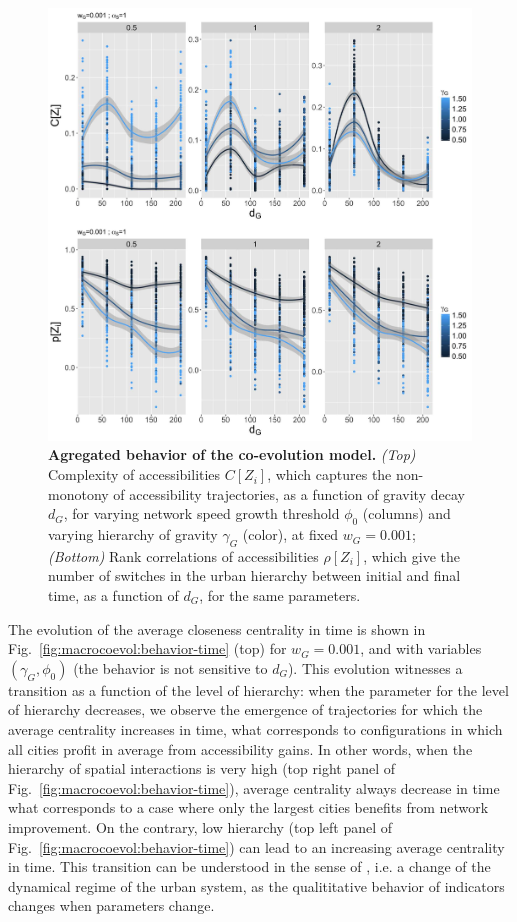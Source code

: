 \documentclass[11pt]{article}
\begin{document}
\begin{figure}
\includegraphics[width=\linewidth]{figures/Fig3.jpg}
\caption{\textbf{Agregated behavior of the co-evolution model.} \textit{(Top)} Complexity of accessibilities $C\left[Z_i \right]$, which captures the non-monotony of accessibility trajectories, as a function of gravity decay $d_G$, for varying network speed growth threshold $\phi_0$ (columns) and varying hierarchy of gravity $\gamma_G$ (color), at fixed $w_G = 0.001$; \textit{(Bottom)} Rank correlations of accessibilities $\rho \left[ Z_i\right]$, which give the number of switches in the urban hierarchy between initial and final time, as a function of $d_G$, for the same parameters.\label{fig:macrocoevol:behavior-aggreg}}
\end{figure}


The evolution of the average closeness centrality in time is shown in Fig.~\ref{fig:macrocoevol:behavior-time} (top) for $w_G = 0.001$, and with variables $(\gamma_G,\phi_0)$ (the behavior is not sensitive to $d_G$). This evolution witnesses a transition as a function of the level of hierarchy: when the parameter for the level of hierarchy decreases, we observe the emergence of trajectories for which the average centrality increases in time, what corresponds to configurations in which all cities profit in average from accessibility gains. In other words, when the hierarchy of spatial interactions is very high (top right panel of Fig.~\ref{fig:macrocoevol:behavior-time}), average centrality always decrease in time what corresponds to a case where only the largest cities benefits from network improvement. On the contrary, low hierarchy (top left panel of Fig.~\ref{fig:macrocoevol:behavior-time}) can lead to an increasing average centrality in time. This transition can be understood in the sense of \cite{sanders2017peupler}, i.e. a change of the dynamical regime of the urban system, as the qualititative behavior of indicators changes when parameters change.
\end{document}
